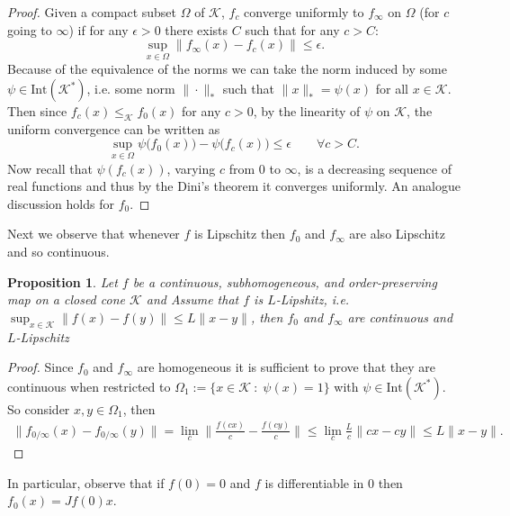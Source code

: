 \documentclass{article}
\newtheorem{proposition}[theorem]{Proposition}
\newcommand{\cone}{\mathcal{K}}
\newcommand{\interior}{\mathrm{Int}}
\newcommand{\cleq}{\leq_{\cone}}
\begin{document}
\begin{proof}
  Given a compact subset $\Omega$ of $\cone$, $f_{c}$ converge uniformly to $f_\infty$ on $\Omega$ (for $c$ going to $\infty$) if for any $\epsilon>0$ there exists $C$ such that for any $c>C$:
    \begin{equation}
        \sup_{x\in \Omega}\|f_{\infty}(x)-f_{c}(x)\|\leq \epsilon.
    \end{equation}
    Because of the equivalence of the norms we can take the norm induced by some $\psi\in \interior(\cone^*)$, i.e. some norm $\|\cdot\|_*$ such that $\|x\|_*=\psi(x)$ for all $x\in \cone$. Then since $f_c(x)\cleq f_0(x)$ for any $c>0$, by the linearity of $\psi$ on $\cone$, the uniform convergence can be written as
        \begin{equation}
        \sup_{x\in \Omega} \psi\big(f_0(x)\big)- \psi\big(f_{c}(x)\big)\leq  \epsilon \qquad \forall c>C.
    \end{equation}
    Now recall that $\psi(f_{c}(x))$, varying $c$ from $0$ to $\infty$, is a decreasing sequence of real functions and thus by the Dini's theorem it converges uniformly. An analogue discussion holds for $f_0$.
\end{proof}
%
%
Next we observe that whenever $f$ is Lipschitz then $f_0$ and $f_{\infty}$ are also Lipschitz and so continuous.
%
\begin{proposition}\label{Prop_lipschitz_subhomogeneous_yields_continuous_limits}
    Let $f$ be a continuous, subhomogeneous, and order-preserving map on a closed cone $\cone$ and Assume that $f$ is $L$-Lipshitz, i.e. $\sup_{x\in\cone}\|f(x)-f(y)\|\leq L \|x-y\|$, then $f_{0}$ and $f_{\infty}$ are continuous and $L$-Lipschitz
\end{proposition}
\begin{proof}
Since $f_0$ and $f_{\infty}$ are homogeneous it is sufficient to prove that they are continuous when restricted to $\Omega_1:=\{x\in\cone\::\;\psi(x)=1\}$ with $\psi\in \interior(\cone^*)$. 
So consider $x,y\in \Omega_1$, then 
\begin{equation}
\begin{aligned}
\|f_{0/\infty}(x)-f_{0/\infty}(y)\|=\lim_{c} \bigg\|\frac{f(cx)}{c}-\frac{f(cy)}{c}\bigg\| 
 \leq \lim_c \frac{L}{c} \big\|cx-cy\big\|\leq L \|x-y\|.
%
\end{aligned}
\end{equation}
\end{proof}
%
In particular, observe that if $f(0)=0$ and $f$ is differentiable in $0$ then $f_0(x)=Jf(0)x$.
\end{document}
